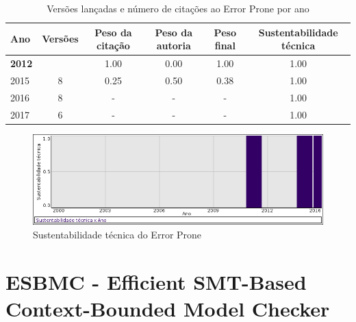 \begin{table}[H]
\caption{Versões lançadas e número de citações ao Error Prone por ano}
\centering
\begin{tabular}{| l | c | c | c | c | c |}
  \hline
  Ano & Versões & Peso da citação & Peso da autoria & Peso final & Sustentabilidade técnica \\
  \hline
            {\bf 2012}
          &
          
          &
          1.00
          &
          0.00
          &
          1.00
          &
            {\color{blue} 1.00}
          \\
\hline
            2015
          &
          8
          &
          0.25
          &
          0.50
          &
          0.38
          &
            {\color{blue} 1.00}
          \\
\hline
        2016 & 8 & - & - & -
        &
          {\color{blue} 1.00}
        \\
\hline
        2017 & 6 & - & - & -
        &
          {\color{blue} 1.00}
        \\
\hline
\end{tabular}
\end{table}

\begin{figure}[h]
  \center
  \includegraphics[scale=0.50]{imagens/softwares-charts/error-prone.png}
  \caption{Sustentabilidade técnica do Error Prone}
\end{figure}


\section{ESBMC - Efficient SMT-Based Context-Bounded Model Checker}


